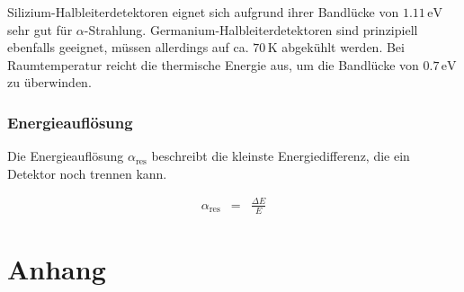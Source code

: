 \documentclass[12pt,a4paper]{scrartcl}
\numberwithin{equation}{section} %
\renewcommand{\[}{} %
\renewcommand{\]}{\noindent} %
\begin{document}
Silizium-Halbleiterdetektoren eignet sich aufgrund ihrer Bandlücke von
$1.11\mathrm{\,eV}$ sehr gut für $\alpha$-Strahlung.
Germanium-Halbleiterdetektoren sind prinzipiell ebenfalls geeignet,
müssen allerdings auf ca. $70\,\mathrm K$ abgekühlt werden. Bei
Raumtemperatur reicht die thermische Energie aus, um die Bandlücke von
$0.7\mathrm{\,eV}$ zu überwinden.

\hypertarget{energieaufloesung}{
	\subsubsection{Energieauflösung}\label{energieaufloesung}}
Die Energieauflösung $\alpha_\mathrm{res}$ beschreibt die kleinste Energiedifferenz, die ein Detektor noch trennen kann.

\begin{eqnarray}
	\alpha_\mathrm{res} &=& \frac{\Delta E}{E} \label{eq:energieaufloesung}
\end{eqnarray}

\clearpage
\hypertarget{Anhang}{
	\section{Anhang}}
	
\end{document}
